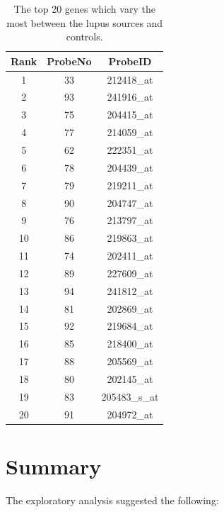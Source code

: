 \documentclass[a4paper, 12pt]{report}
\begin{document}
\begin{table}[h]
\centering
\begin{tabular}{ccc}
  \hline
Rank & ProbeNo & ProbeID \\ 
  \hline
1 &  33 & 212418\_at \\ 
  2 &  93 & 241916\_at \\ 
  3 &  75 & 204415\_at \\ 
  4 &  77 & 214059\_at \\ 
  5 &  62 & 222351\_at \\ 
  6 &  78 & 204439\_at \\ 
  7 &  79 & 219211\_at \\ 
  8 &  90 & 204747\_at \\ 
  9 &  76 & 213797\_at \\ 
  10 &  86 & 219863\_at \\ 
  11 &  74 & 202411\_at \\ 
  12 &  89 & 227609\_at \\ 
  13 &  94 & 241812\_at \\ 
  14 &  81 & 202869\_at \\ 
  15 &  92 & 219684\_at \\ 
  16 &  85 & 218400\_at \\ 
  17 &  88 & 205569\_at \\ 
  18 &  80 & 202145\_at \\ 
  19 &  83 & 205483\_s\_at \\ 
  20 &  91 & 204972\_at \\ 
   \hline
\end{tabular}
\caption{The top 20 genes which vary the most between the lupus sources and controls.} 
\label{T:DEGT}
\end{table}


\section{Summary}
The exploratory analysis suggested the following: 
\end{document}
